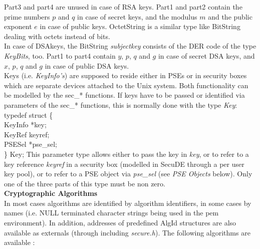 Part3 and part4 are unused in case of RSA keys.
Part1 and part2 contain the prime numbers $p$ and $q$ in case of secret keys, and the 
modulus $m$ and the public exponent $e$ in case of public keys. OctetString is a similar
type like BitString dealing with octets instead of bits. 
\\ [1em]
In case of DSAkeys, the BitString {\em subjectkey} consists of the DER 
code  of the type {\em KeyBits}, too.
Part1 to part4 contain $y$, $p$, $q$ and $g$ in case of secret DSA keys, and  
$x$, $p$, $q$ and $g$ in case of public DSA keys. 
\\ [1em]
Keys (i.e. {\em KeyInfo's}) are supposed to reside either in PSEs or in security boxes
which are separate devices attached to the Unix system. Both functionality can be modelled by
the sec\_* functions. If keys have to be passed or identified via
parameters of the sec\_* functions, this is normally done with the type 
{\em Key}:
{\small
\btab
\2 typedef struct \{ \\
\3      KeyInfo  \1 *key; \\
\3      KeyRef   \1  keyref; \\
\3      PSESel    \1 *pse\_sel; \\
\2 \} Key;
\etab
}
This parameter type allows either to pass the key in {\em key}, or to refer 
to a key reference
{\em keyref} in a security box (modelled in SecuDE through a per user key 
pool), 
or to refer to a PSE object via {\em pse\_sel} (see {\em PSE Objects} 
below). 
Only one of the three parts of this type must be non zero. 
\\ [1em]
{\bf Cryptographic Algorithms}
\\ [1em]
In most cases algorithms are identified by algorithm identifiers, in some 
cases by names (i.e.
NULL terminated character strings being used in the pem environment). 
In addition, addresses of predefined AlgId structures
are also available as externals (through including {\em secure.h}). The 
following algorithms are available :
\bc
